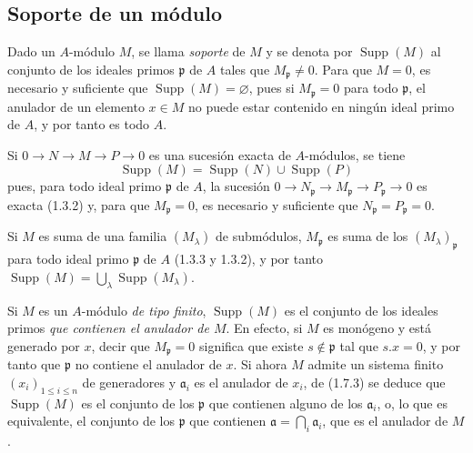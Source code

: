 \subsection{Soporte de un módulo}
\label{subsection:0.1.7-fr}

\begin{env}[1.7.1]
\label{0.1.7.1-fr}
Dado un $A$-módulo $M$, se llama \emph{soporte} de $M$ y se denota por
$\operatorname{Supp}(M)$ al conjunto de los ideales primos $\mathfrak p$ de $A$
tales que $M_{\mathfrak p}\neq0$. Para que $M=0$, es necesario y suficiente que
$\operatorname{Supp}(M)=\varnothing$, pues si $M_{\mathfrak p}=0$ para todo
$\mathfrak p$, el anulador de un elemento $x\in M$ no puede estar contenido en
ningún ideal primo de $A$, y por tanto es todo $A$.
\end{env}

\begin{env}[1.7.2]
\label{0.1.7.2-fr}
Si $0\to N\to M\to P\to0$ es una sucesión exacta de $A$-módulos, se tiene
\[
  \operatorname{Supp}(M)=\operatorname{Supp}(N)\cup\operatorname{Supp}(P)
\]
pues, para todo ideal primo $\mathfrak p$ de $A$, la sucesión
$0\to N_{\mathfrak p}\to M_{\mathfrak p}\to P_{\mathfrak p}\to0$ es exacta
(1.3.2) y, para que $M_{\mathfrak p}=0$, es necesario y suficiente que
$N_{\mathfrak p}=P_{\mathfrak p}=0$.
\end{env}

\begin{env}[1.7.3]
\label{0.1.7.3-fr}
Si $M$ es suma de una familia $(M_\lambda)$ de submódulos,
$M_{\mathfrak p}$ es suma de los $(M_\lambda)_{\mathfrak p}$ para todo ideal
primo $\mathfrak p$ de $A$ (1.3.3 y 1.3.2), y por tanto
$\operatorname{Supp}(M)=\bigcup_\lambda\operatorname{Supp}(M_\lambda)$.
\end{env}

\begin{env}[1.7.4]
\label{0.1.7.4-fr}
Si $M$ es un $A$-módulo \emph{de tipo finito}, $\operatorname{Supp}(M)$ es
el conjunto de los ideales primos \emph{que contienen el anulador de $M$}. En efecto,
si $M$ es monógeno y está generado por $x$, decir que $M_{\mathfrak p}=0$ significa
que existe $s\notin\mathfrak p$ tal que $s.x=0$, y por tanto que $\mathfrak p$ no
contiene el anulador de $x$. Si ahora $M$ admite un sistema finito
$(x_i)_{1\leq i\leq n}$ de generadores y $\mathfrak a_i$ es el anulador
de $x_i$, de (1.7.3) se deduce que $\operatorname{Supp}(M)$ es el conjunto de los
$\mathfrak p$ que contienen alguno de los $\mathfrak a_i$, o, lo que es equivalente,
el conjunto de los $\mathfrak p$ que contienen $\mathfrak a=\bigcap_i\mathfrak a_i$,
que es el anulador de $M$.
\end{env}

